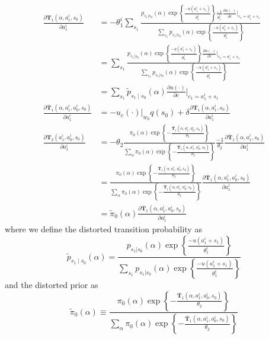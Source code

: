 \documentclass[a4paper,12pt]{article}
\begin{document}
\begin{align}
\frac{\partial \mathbf{T}_1(\alpha,a_1^i,s_0)}{\partial a_1^i} &= -\theta_1^i \sum_{s_1}{ \frac{p_{s_1|s_0}(\alpha) \exp\left\{{\frac{-u(a_1^i + s_1)}{\theta_1^i}}\right\}\frac{-1}{\theta_1^i} \frac{\partial u(\cdot)}{\partial c}\Big |_{c_1=a_1^i + s_1}}{\sum_{s_1}{p_{s_1|s_0}(\alpha) \exp\left\{{\frac{-u(a_1^i + s_1)}{\theta_1^i}}\right\}}}}  \nonumber\\
&=\sum_{s_1}{ \frac{p_{s_1|s_0}(\alpha) \exp\left\{{\frac{-u(a_1^i + s_1)}{\theta_1^i}}\right\} \frac{\partial u(\cdot)}{\partial c}\Big |_{c_1=a_1^i + s_1}}{\sum_{s_1}{p_{s_1|s_0}(\alpha) \exp\left\{{\frac{-u(a_1^i + s_1)}{\theta_1^i}}\right\}}}}  \nonumber\\
&=\sum_{s_1}{\tilde{p}_{s_1 \mid s_0}(\alpha) \frac{\partial u(\cdot)}{\partial c}\Big |_{c_1=a_1^i + s_1}} \label{eq:T1}\\
\frac{\partial \bar{\mathbf{T}}_1(\alpha,a_1^i,a_0^i,s_0)}{\partial a_1^i} &= -u_c(\cdot)\vert_{w_0} q(s_0) + \delta \frac{\partial \mathbf{T}_1(\alpha,a_1^i,s_0)}{\partial a_1^i} \label{eq:T11} \\
\frac{\partial \mathbf{T}_2(a_1^i,a_0^i,s_0)}{\partial a_1^i}    &= -\theta_2 \frac{\pi_0(\alpha)\exp\left \{ - \frac{\bar{\mathbf{T}}_1(\alpha, a_1^i,a_0^i,s_0)}{\theta_2} \right\}}{\sum_{\alpha}{\pi_0(\alpha)\exp\left \{ -\frac{\bar{\mathbf{T}}_1(\alpha,a_1^i,a_0^i,s_0)}{\theta_2} \right\}}} \frac{-1}{\theta_2} \frac{\partial \bar{\mathbf{T}}_1(\alpha,a_1^i,s_0)}{\partial a_1^i} \nonumber\\
&=\frac{\pi_0(\alpha)\exp\left \{ - \frac{\bar{\mathbf{T}}_1(\alpha, a_1^i,a_0^i,s_0)}{\theta_2} \right\}}{\sum_{\alpha}{\pi_0(\alpha)\exp\left \{ -\frac{\bar{\mathbf{T}}_1(\alpha, a_1^i,a_0^i,s_0)}{\theta_2} \right\}}} \frac{\partial \bar{\mathbf{T}}_1(\alpha,a_1^i,a_0^i,s_0)}{\partial a_1^i} \nonumber \\
&= \tilde{\pi}_0(\alpha) \frac{\partial \bar{\mathbf{T}}_1(\alpha,a_1^i,a_0^i,s_0)}{\partial a_1^i} \label{eq:T2}
\end{align}
where we define the distorted transition probability as
\[
\tilde{p}_{s_1 \mid s_0}(\alpha) = \frac{p_{s_1|s_0}(\alpha) \exp\left\{{\frac{-u(a_1^i + s_1)}{\theta_1^i}}\right\}}{\sum_{s_1}{p_{s_1|s_0}(\alpha) \exp\left\{{\frac{-u(a_1^i + s_1)}{\theta_1^i}}\right\}}}
\]
and the distorted prior as
\[
\tilde{\pi}_0(\alpha) \equiv \frac{\pi_0(\alpha)\exp\left \{ - \frac{\bar{\mathbf{T}}_1(\alpha, a_1^i,a_0^i,s_0)}{\theta_2} \right\}}{\sum_{\alpha}{\pi_0(\alpha)\exp\left \{ -\frac{\bar{\mathbf{T}}_1(\alpha, a_1^i,a_0^i,s_0)}{\theta_2} \right\}}}
\]
\end{document}
